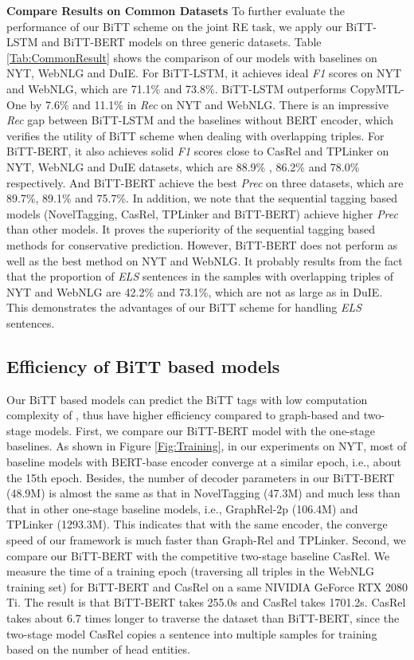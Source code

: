 \documentclass[conference]{IEEEtran}
\newcommand{\yankun}[1]{\textcolor{black}{#1}}
\begin{document}
\textbf{Compare Results on Common Datasets} To further evaluate the performance of our BiTT scheme on the joint RE task, we apply our BiTT-LSTM and BiTT-BERT models on three generic datasets. Table \ref{Tab:CommonResult} shows the comparison of our models with baselines on NYT, WebNLG and DuIE.
For BiTT-LSTM, it achieves ideal \emph{F1} scores on NYT and WebNLG, which are 71.1\% and 73.8\%. BiTT-LSTM outperforms CopyMTL-One by 7.6\% and 11.1\% in \emph{Rec} on NYT and WebNLG. There is an impressive \emph{Rec} gap between BiTT-LSTM and the baselines without BERT encoder, which verifies the utility of BiTT scheme when dealing with overlapping triples. For BiTT-BERT, it also achieves solid \emph{F1} scores close to CasRel and TPLinker on NYT, WebNLG and DuIE datasets, which are 88.9\% , 86.2\% and 78.0\% respectively. And BiTT-BERT achieve the best \emph{Prec} on three datasets, which are 89.7\%, 89.1\% and 75.7\%. In addition, we note that the sequential tagging based models (NovelTagging, CasRel, TPLinker and BiTT-BERT) achieve higher \emph{Prec} than other models. It proves the superiority of the sequential tagging based methods for conservative prediction. However, BiTT-BERT does not perform as well as the best method on NYT and WebNLG. It probably results from the fact that the proportion of \emph{ELS} sentences in the samples with overlapping triples of NYT and WebNLG are 42.2\% and 73.1\%, which are not as large as in DuIE. This demonstrates the advantages of our BiTT scheme for handling \emph{ELS} sentences.

\subsection{Efficiency of BiTT based models} Our BiTT based models can predict the BiTT tags with low computation complexity of , thus have higher efficiency compared to graph-based and two-stage models. First, we compare our BiTT-BERT model with the one-stage baselines. As shown in Figure \ref{Fig:Training}, in our experiments on NYT, most of baseline models with BERT-base encoder converge at a similar epoch, i.e., about the 15th epoch. 
Besides, the number of decoder parameters in our BiTT-BERT (48.9M) is almost the same as that in NovelTagging (47.3M) and much less than that in other one-stage baseline models, i.e., GraphRel-2p (106.4M) and TPLinker (1293.3M). This indicates that with the same encoder, the converge speed of our framework is much faster than Graph-Rel and TPLinker.
Second, we compare \yankun{our} BiTT-BERT with the competitive two-stage baseline CasRel. We measure the time of a training epoch (traversing all triples in the WebNLG training set) for BiTT-BERT and CasRel on a same NIVIDIA GeForce RTX 2080 Ti. The result is that BiTT-BERT takes 255.0s and CasRel takes 1701.2s. CasRel takes about 6.7 times longer to traverse the dataset than BiTT-BERT, since the two-stage model CasRel copies a sentence into multiple samples for training based on the number of head entities.
\end{document}
